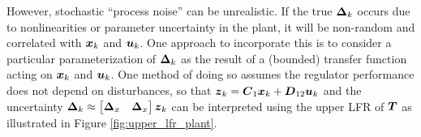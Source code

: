 However, stochastic ``process noise'' can be unrealistic.  If the true $\vb*{\Delta}_{k}$ occurs due to nonlinearities or parameter uncertainty in the plant, it will be non-random \cite{kalman1994randomness} and correlated with $\vb*{x}_{k}$ and $\vb*{u}_{k}$.  One approach to incorporate this is to consider a particular parameterization of $\vb*{\Delta}_{k}$ as the result of a (bounded) transfer function acting on $\vb*{x}_{k}$ and $\vb*{u}_{k}$.  One method of doing so assumes the regulator performance does not depend on disturbances, so that $\vb*{z}_{k} = \vb*{C}_{1}\vb*{x}_{k} + \vb*{D}_{12}\vb*{u}_{k}$ and the uncertainty $\vb*{\Delta}_{k} \approx \begin{bmatrix} \vb*{\Delta}_{x} & \vb*{\Delta}_{x} \end{bmatrix} \vb*{z}_{k}$ can be interpreted using the upper LFR of $\vb*{T}$ as illustrated in Figure \ref{fig:upper_lfr_plant}.
